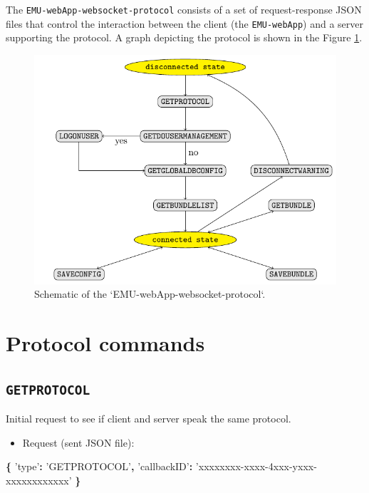 \documentclass[]{book}
\newenvironment{Shaded}{\begin{snugshade}}{\end{snugshade}}
\newcommand{\OperatorTok}[1]{\textcolor[rgb]{0.81,0.36,0.00}{\textbf{#1}}}
\newcommand{\StringTok}[1]{\textcolor[rgb]{0.31,0.60,0.02}{#1}}
\providecommand{\tightlist}{%
  \setlength{\itemsep}{0pt}\setlength{\parskip}{0pt}}
\theoremstyle{definition}
\theoremstyle{definition}
\theoremstyle{definition}
\theoremstyle{remark}
\begin{document}
The \texttt{EMU-webApp-websocket-protocol} consists of a set of
request-response JSON files that control the interaction between the
client (the \texttt{EMU-webApp}) and a server supporting the protocol. A
graph depicting the protocol is shown in the Figure
\ref{fig:app-chapWsProtocolGraph}.

\begin{figure}

{\centering \includegraphics[width=0.75\linewidth]{pics/protocol} 

}

\caption{Schematic of the `EMU-webApp-websocket-protocol`.}\label{fig:app-chapWsProtocolGraph}
\end{figure}

\hypertarget{protocol-commands}{%
\section{Protocol commands}\label{protocol-commands}}

\hypertarget{getprotocol}{%
\subsection{\texorpdfstring{\texttt{GETPROTOCOL}}{GETPROTOCOL}}\label{getprotocol}}

Initial request to see if client and server speak the same protocol.

\begin{itemize}
\tightlist
\item
  Request (sent JSON file):
\end{itemize}

\begin{Shaded}
\begin{Highlighting}[]
\OperatorTok{\{}
  \StringTok{'type'}\OperatorTok{:} \StringTok{'GETPROTOCOL'}\OperatorTok{,}
  \StringTok{'callbackID'}\OperatorTok{:} \StringTok{'xxxxxxxx-xxxx-4xxx-yxxx-xxxxxxxxxxxx'}
\OperatorTok{\}}
\end{Highlighting}
\end{Shaded}
\end{document}
